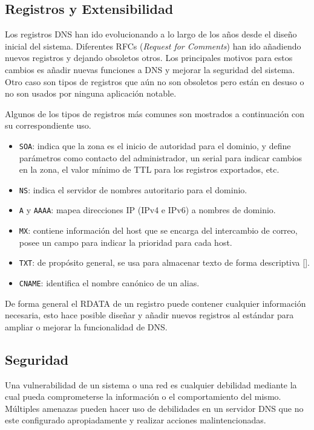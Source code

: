 \subsection{Registros y Extensibilidad}

Los registros DNS han ido evolucionando a lo largo de los años desde el diseño inicial del sistema. Diferentes RFCs (\textit{Request for Comments}) han ido añadiendo nuevos registros y dejando obsoletos otros. Los principales motivos para estos cambios es añadir nuevas funciones a DNS y mejorar la seguridad del sistema. Otro caso son tipos de registros que aún no son obsoletos pero están en desuso o no son usados por ninguna aplicación notable.

Algunos de los tipos de registros más comunes son mostrados a continuación con su correspondiente uso.

\begin{itemize}
    \item \verb+SOA+: indica que la zona es el inicio de autoridad para el dominio, y define parámetros como contacto del administrador, un serial para indicar cambios en la zona, el valor mínimo de TTL para los registros exportados, etc.
    \item \verb+NS+: indica el servidor de nombres autoritario para el dominio.
    \item \verb+A+ y \verb+AAAA+: mapea direcciones IP (IPv4 e IPv6) a nombres de dominio.
    \item \verb+MX+: contiene información del host que se encarga del intercambio de correo, posee un campo para indicar la prioridad para cada host.\
    \item \verb+TXT+: de propósito general, se usa para almacenar texto de forma descriptiva [\cite{rfc_1464}].
    \item \verb+CNAME+: identifica el nombre canónico de un alias.
\end{itemize}

De forma general el RDATA de un registro puede contener cualquier información necesaria, esto hace posible diseñar y añadir nuevos registros al estándar para ampliar o mejorar la funcionalidad de DNS.

\subsection{Seguridad}

Una vulnerabilidad de un sistema o una red es cualquier debilidad mediante la cual pueda comprometerse la información o el comportamiento del mismo. Múltiples amenazas pueden hacer uso de debilidades en un servidor DNS que no este configurado apropiadamente y realizar acciones malintencionadas.

